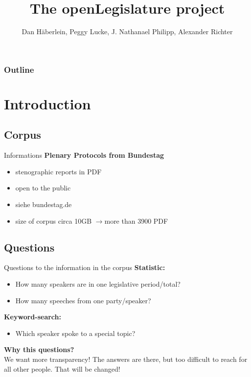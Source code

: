 \documentclass[11pt, a4paper]{beamer}
\author{Dan Häberlein, Peggy Lucke, J. Nathanael Philipp, Alexander Richter}
\title{The openLegislature project}
\date{}
\institute{Universität Leipzig}
\begin{document}
\section{}
\begin{frame}
\titlepage
\end{frame}


	\begin{frame}
		\frametitle{Outline}
		\tableofcontents
	\end{frame}

\section{Introduction}
\subsection{Corpus}
\begin{frame}{Informations}
\textbf{Plenary Protocols from Bundestag}
\begin{itemize}
\item stenographic reports in PDF
\item open to the public
\item siehe bundestag.de \cite{bundestag} \\[1em]
\item size of corpus circa 10GB $\rightarrow$more than 3900 PDF
\end{itemize}
\end{frame}

\subsection{Questions}
\begin{frame}{Questions to the information in the corpus}
\textbf{Statistic:}
\begin{itemize}
\item How many speakers are in one legislative period/total?
\item How many speeches from one party/speaker?
\end{itemize}
\textbf{Keyword-search:}
\begin{itemize}
\item Which speaker spoke to a special topic?
\end{itemize}
\textbf{Why this questions?}\\
We want more transparency! The answers are there, but too difficult to reach for all other people. That will be changed!
\end{frame}
\end{document}
